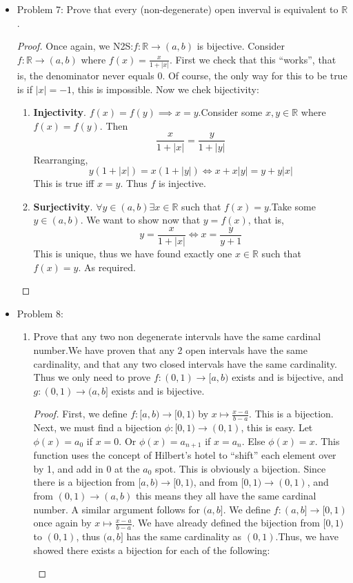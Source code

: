 \documentclass[hidelinks,12pt]{article}
\theoremstyle{definition}
\newcommand{\R}{\mathbb{R}}
\begin{document}
\begin{itemize}
\begin{proof}
    Thus, since $f$ is both injective and surjective, by definition 2.2, $[0,1]$ has the same cardinality as $[a,b]$ where $a,b\in\R$, and $b\neq0$.
    \end{proof}
    \item Problem 7: Prove that every (non-degenerate) open inverval is equivalent to $\R$.\begin{proof}Once again, we N2S:$f:\R\to(a,b)$ is bijective. \newline Consider $f:\R\to(a,b)$ where $f(x)=\frac{x}{1+|x|}$. First we check that this ``works'', that is, the denominator never equals 0. Of course, the only way for this to be true is if $|x|=-1$, this is impossible. Now we chek bijectivity:\begin{enumerate}
        \item \textbf{Injectivity}. $f(x)=f(y)\implies x=y$.\newline Consider some $x,y\in\R$ where $f(x)=f(y)$. Then $$\frac{x}{1+|x|}=\frac{y}{1+|y|}$$ Rearranging, $$y(1+|x|)=x(1+|y|)\Leftrightarrow x+x|y|=y+y|x|$$ This is true iff $x=y$. Thus $f$ is injective.
        \item \textbf{Surjectivity}. $\forall y\in(a,b)\exists x\in\R$ such that $f(x)=y$.\newline Take some $y\in(a,b)$. We want to show now that $y=f(x)$, that is, $$y=\frac{x}{1+|x|}\Leftrightarrow x=\frac{y}{y+1}$$ This is unique, thus we have found exactly one $x\in\R$ such that $f(x)=y$. As required. 
    \end{enumerate}
    \end{proof}
    \item Problem 8: \begin{enumerate}[label=(\alph*)]
        \item Prove that any two non degenerate intervals have the same cardinal number.\newline We have proven that any 2 open intervals have the same cardinality, and that any two closed intervals have the same cardinality. Thus we only need to prove $f:(0,1)\to[a,b)$ exists and is bijective, and $g:(0,1)\to(a,b]$ exists and is bijective.\begin{proof}First, we define $f:[a,b)\to[0,1)$ by $x\mapsto\frac{x-a}{b-a}$. This is a bijection. Next, we must find a bijection $\phi:[0,1)\to(0,1)$, this is easy. Let $\phi(x)=a_0$ if $x=0$. Or $\phi(x)=a_{n+1}$ if $x=a_n$. Else $\phi(x)=x$. This function uses the concept of Hilbert's hotel to ``shift'' each element over by 1, and add in 0 at the $a_0$ spot. This is obviously a bijection. Since there is a bijection from $[a,b)\to[0,1)$, and from $[0,1)\to(0,1)$, and from $(0,1)\to(a,b)$ this means they all have the same cardinal number. A similar argument follows for $(a,b]$. We define $f:(a,b]\to[0,1)$ once again by $x\mapsto\frac{x-a}{b-a}$. We have already defined the bijection from $[0,1)$ to $(0,1)$, thus $(a,b]$ has the same cardinality as $(0,1)$.\newline Thus, we have showed there exists a bijection for each of the following:\begin{enumerate}[label=(\roman*)]

\end{enumerate}
\end{proof}
\end{enumerate}
\end{itemize}
\end{document}
